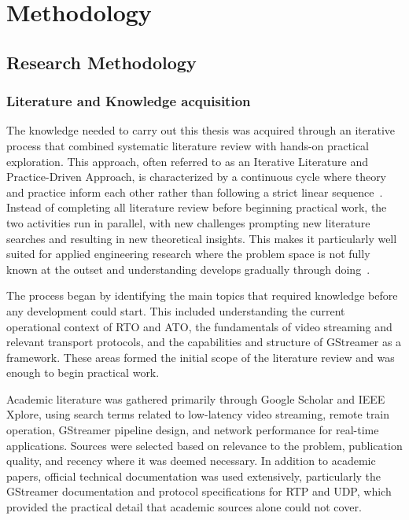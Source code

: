 \section{Methodology}\label{chap:methodology}

\vspace{5mm}
\subsection{Research Methodology}

\subsubsection{Literature and Knowledge acquisition}
The knowledge needed to carry out this thesis was acquired through an iterative process that combined systematic literature review with hands-on practical exploration. This approach, often referred to as an Iterative Literature and Practice-Driven Approach, is characterized by a continuous cycle where theory and practice inform each other rather than following a strict linear sequence~\cite{wohlin2012}. Instead of completing all literature review before beginning practical work, the two activities run in parallel, with new challenges prompting new literature searches and resulting in new theoretical insights. This makes it particularly well suited for applied engineering research where the problem space is not fully known at the outset and understanding develops gradually through doing~\cite{hevner2004, saunders2019}.

The process began by identifying the main topics that required knowledge before any development could start. This included understanding the current operational context of RTO and ATO, the fundamentals of video streaming and relevant transport protocols, and the capabilities and structure of GStreamer as a framework. These areas formed the initial scope of the literature review and was enough to begin practical work.

Academic literature was gathered primarily through Google Scholar and IEEE Xplore, using search terms related to low-latency video streaming, remote train operation, GStreamer pipeline design, and network performance for real-time applications. Sources were selected based on relevance to the problem, publication quality, and recency where it was deemed necessary. In addition to academic papers, official technical documentation was used extensively, particularly the GStreamer documentation and protocol specifications for RTP and UDP, which provided the practical detail that academic sources alone could not cover.

